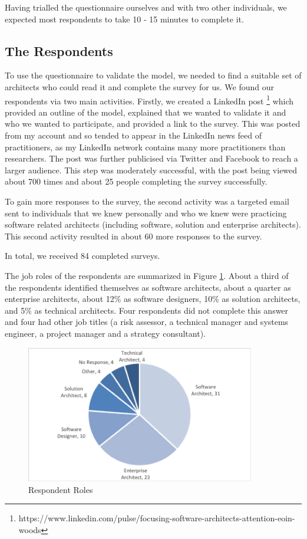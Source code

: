 Having trialled the questionnaire ourselves and with two other individuals, we expected most respondents to take 10 - 15 minutes to complete it.

\subsection{The Respondents}

To use the questionnaire to validate the model, we needed to find a suitable set of architects who could read it and complete the survey for us.  We found our respondents via two main activities.  
Firstly, we created a LinkedIn post \footnote{https://www.linkedin.com/pulse/focusing-software-architects-attention-eoin-woods} which provided an outline of the model, explained that we wanted to validate it and who we wanted to participate, and provided a link to the survey.  This was posted from my account and so tended to appear in the LinkedIn news feed of practitioners, as my LinkedIn network contains many more practitioners than researchers.  The post was further publicised via Twitter and Facebook to reach a larger audience.  This step was moderately successful, with the post being viewed about 700 times and about 25 people completing the survey successfully.

To gain more responses to the survey, the second activity was a targeted email sent to individuals that we knew personally and who we knew were practicing software related architects (including software, solution and enterprise architects).  This second activity resulted in about 60 more responses to the survey.

In total, we received 84 completed surveys.

The job roles of the respondents are summarized in Figure \ref{figure:resproles}.  About a third of the respondents identified themselves as software architects, about a quarter as enterprise architects, about 12\% as software designers, 10\% as solution architects, and 5\% as technical architects.  Four respondents did not complete this answer and four had other job titles (a risk assessor, a technical manager and systems engineer, a project manager and a strategy consultant).

\begin{figure}
\centering
\includegraphics[width=10cm,trim={2 2 2 2},clip]{Figures/prioritisation-detailed-roles}
\caption{Respondent Roles}
\label{figure:resproles}
\end{figure}


